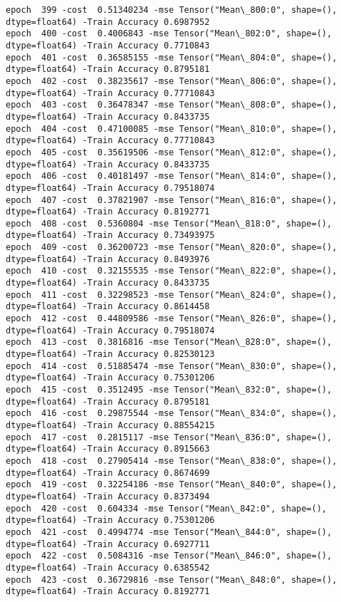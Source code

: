 \documentclass[11pt]{article}
\begin{document}
\begin{Verbatim}[commandchars=\\\{\}]
epoch  399 -cost  0.51340234 -mse Tensor("Mean\_800:0", shape=(), dtype=float64) -Train Accuracy 0.6987952
epoch  400 -cost  0.4006843 -mse Tensor("Mean\_802:0", shape=(), dtype=float64) -Train Accuracy 0.7710843
epoch  401 -cost  0.36585155 -mse Tensor("Mean\_804:0", shape=(), dtype=float64) -Train Accuracy 0.8795181
epoch  402 -cost  0.38235617 -mse Tensor("Mean\_806:0", shape=(), dtype=float64) -Train Accuracy 0.77710843
epoch  403 -cost  0.36478347 -mse Tensor("Mean\_808:0", shape=(), dtype=float64) -Train Accuracy 0.8433735
epoch  404 -cost  0.47100085 -mse Tensor("Mean\_810:0", shape=(), dtype=float64) -Train Accuracy 0.77710843
epoch  405 -cost  0.35619506 -mse Tensor("Mean\_812:0", shape=(), dtype=float64) -Train Accuracy 0.8433735
epoch  406 -cost  0.40181497 -mse Tensor("Mean\_814:0", shape=(), dtype=float64) -Train Accuracy 0.79518074
epoch  407 -cost  0.37821907 -mse Tensor("Mean\_816:0", shape=(), dtype=float64) -Train Accuracy 0.8192771
epoch  408 -cost  0.5360804 -mse Tensor("Mean\_818:0", shape=(), dtype=float64) -Train Accuracy 0.73493975
epoch  409 -cost  0.36200723 -mse Tensor("Mean\_820:0", shape=(), dtype=float64) -Train Accuracy 0.8493976
epoch  410 -cost  0.32155535 -mse Tensor("Mean\_822:0", shape=(), dtype=float64) -Train Accuracy 0.8433735
epoch  411 -cost  0.32298523 -mse Tensor("Mean\_824:0", shape=(), dtype=float64) -Train Accuracy 0.8614458
epoch  412 -cost  0.44809586 -mse Tensor("Mean\_826:0", shape=(), dtype=float64) -Train Accuracy 0.79518074
epoch  413 -cost  0.3816816 -mse Tensor("Mean\_828:0", shape=(), dtype=float64) -Train Accuracy 0.82530123
epoch  414 -cost  0.51885474 -mse Tensor("Mean\_830:0", shape=(), dtype=float64) -Train Accuracy 0.75301206
epoch  415 -cost  0.3512495 -mse Tensor("Mean\_832:0", shape=(), dtype=float64) -Train Accuracy 0.8795181
epoch  416 -cost  0.29875544 -mse Tensor("Mean\_834:0", shape=(), dtype=float64) -Train Accuracy 0.88554215
epoch  417 -cost  0.2815117 -mse Tensor("Mean\_836:0", shape=(), dtype=float64) -Train Accuracy 0.8915663
epoch  418 -cost  0.27905414 -mse Tensor("Mean\_838:0", shape=(), dtype=float64) -Train Accuracy 0.8674699
epoch  419 -cost  0.32254186 -mse Tensor("Mean\_840:0", shape=(), dtype=float64) -Train Accuracy 0.8373494
epoch  420 -cost  0.604334 -mse Tensor("Mean\_842:0", shape=(), dtype=float64) -Train Accuracy 0.75301206
epoch  421 -cost  0.4994774 -mse Tensor("Mean\_844:0", shape=(), dtype=float64) -Train Accuracy 0.6927711
epoch  422 -cost  0.5084316 -mse Tensor("Mean\_846:0", shape=(), dtype=float64) -Train Accuracy 0.6385542
epoch  423 -cost  0.36729816 -mse Tensor("Mean\_848:0", shape=(), dtype=float64) -Train Accuracy 0.8192771

\end{Verbatim}
\end{document}
